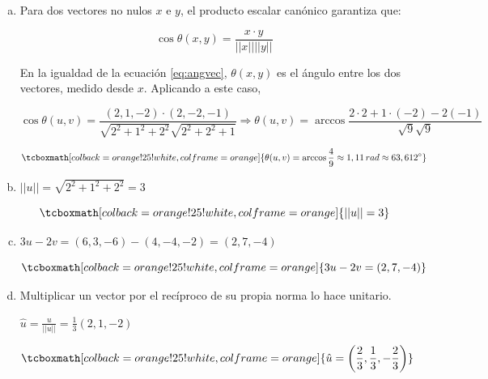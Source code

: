 \documentclass{article}
\begin{document}
\begin{enumerate}[(a)]
\item Para dos vectores no nulos $x$ e $y$, el producto escalar canónico garantiza que:

\begin{equation}
\cos \theta(x,y) = \frac{x \cdot y}{||x|| ||y||}
\label{eq:angvec}
\end{equation}

En la igualdad de la ecuación \ref{eq:angvec}, $\theta(x, y)$ es el ángulo entre los dos vectores, medido desde $x$. Aplicando a este caso,

\begin{equation}
\cos \theta(u,v) = \frac{(2, 1, -2) \cdot (2, -2, -1)}{\sqrt{2^2 + 1^2 + 2^2} \sqrt{2^2 + 2^2 + 1}} \Rightarrow \theta(u, v) =  \arccos \frac{2 \cdot 2 + 1 \cdot (-2) -2 (-1)}{\sqrt{9} \sqrt{9}}
\end{equation}

\begin{equation}
\tcboxmath[colback=orange!25!white,colframe=orange]
{ \theta(u, v) = \arccos \frac{4}{9} \approx 1,11 \mathop{rad} \approx 63,612^{\circ} }
\end{equation}

\item $||u|| = \sqrt{2^2 + 1^2 + 2^2} = 3$

\begin{equation}
\tcboxmath[colback=orange!25!white,colframe=orange]
{ ||u|| = 3 }
\end{equation}

\item $3u - 2v = (6, 3, -6) - (4, -4, -2) = (2, 7, -4)$

\begin{equation}
\tcboxmath[colback=orange!25!white,colframe=orange]
{ 3u - 2v = (2, 7, -4) }
\end{equation}

\item Multiplicar un vector por el recíproco de su propia norma lo hace unitario.

$\hat{u} = \frac{u}{||u||} = \frac{1}{3} (2, 1, -2)$
 
\begin{equation}
\tcboxmath[colback=orange!25!white,colframe=orange]
{ \hat{u} = \left( \frac{2}{3}, \frac{1}{3}, -\frac{2}{3} \right) }
\end{equation}

\end{enumerate}
\end{document}
